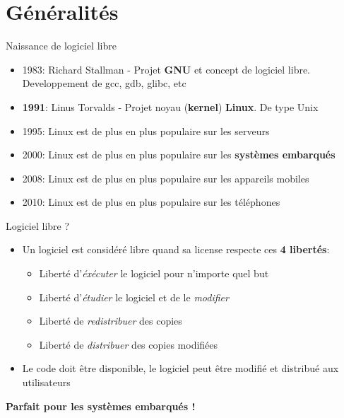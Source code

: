 \section{Généralités}

 \begin{frame}{Naissance de logiciel libre}{}
  \begin{itemize}
  \item 1983: Richard Stallman - Projet \textbf{GNU} et concept de logiciel libre. Developpement de gcc, gdb, glibc, etc
  \item \textbf{1991}: Linus Torvalds - Projet noyau (\textbf{kernel}) \textbf{Linux}. De type Unix
  \item 1995: Linux est de plus en plus populaire sur les serveurs
  \item 2000: Linux est de plus en plus populaire sur les \textbf{systèmes embarqués}
  \item 2008: Linux est de plus en plus populaire sur les appareils mobiles
  \item 2010: Linux est de plus en plus populaire sur les téléphones
  \end{itemize}
\end{frame}

\begin{frame}{Logiciel libre ?}{}
  \begin{itemize}
  \item Un logiciel est considéré libre quand sa license respecte ces \textbf{4 libertés}:
    \begin{itemize}
    \item Liberté d'\textit{éxécuter} le logiciel pour n'importe quel but
    \item Liberté d'\textit{étudier} le logiciel et de le \textit{modifier}
    \item Liberté de \textit{redistribuer} des copies
    \item Liberté de \textit{distribuer} des copies modifiées
    \end{itemize}
  \item Le code doit être disponible, le logiciel peut être modifié et distribué aux utilisateurs
  \end{itemize}
  \center\textbf{Parfait pour les systèmes embarqués !}
\end{frame}

